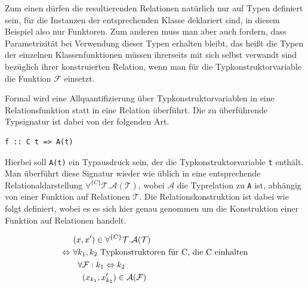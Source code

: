 
Zum einen dürfen die resultierenden Relationen natürlich nur auf Typen definiert sein, für die Instanzen der entsprechenden
Klasse deklariert sind, in diesem Beispiel also nur Funktoren.
Zum anderen muss man aber auch fordern, dass Parametrizität bei Verwendung dieser Typen erhalten bleibt,
das heißt die Typen der einzelnen Klassenfunktionen müssen ihrerseits mit sich selbst verwandt sind bezüglich ihrer konstruierten Relation, wenn man für
die Typkonstruktorvariable die Funktion $\mathcal{F}$ einsetzt.


Formal wird eine Allquantifizierung über Typkonstruktorvariablen in eine Relationsfunktion statt in eine Relation überführt. Die
zu überführende Typsignatur ist dabei von der folgenden Art.

\begin{verbatim}
f :: C t => A(t)
\end{verbatim}

Hierbei soll \texttt{A(t)} ein Typausdruck sein, der die Typkonstruktorvariable \texttt{t} enthält. Man überführt diese Signatur wieder
wie üblich in eine entsprechende Relationaldarstellung $\forall^{\{C\}} \mathcal{T} . \mathcal{A}(\mathcal{T})$, wobei $\mathcal{A}$
die Typrelation zu \texttt{A} ist, abhängig von einer Funktion auf Relationen $\mathcal{T}$. Die Relationskonstruktion ist
dabei wie folgt definiert, wobei es es sich hier genau genommen um die Konstruktion einer Funktion auf Relationen handelt.


\begin{align*}
& (x, x') \in \forall^{\{C\}} \mathcal{T} . \mathcal{A}(\mathcal{T}) \\
\Leftrightarrow ~& \forall k_1, k_2~\text{Typkonstruktoren für C, die C einhalten}\\
& \hphantom{\forall} \forall \mathcal{F} : k_1 \Leftrightarrow k_2 \\
& \hphantom{\forall \forall} (x_{k_1}, x'_{k_2}) \in \mathcal{A}(\mathcal{F})
\end{align*}

